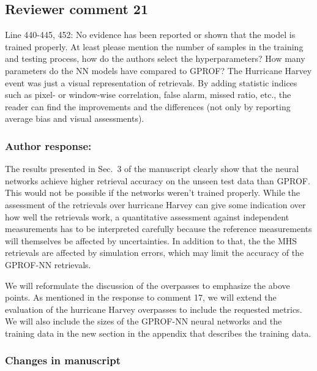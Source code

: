 \subsection{Reviewer comment 21}

Line 440-445, 452: No evidence has been reported or shown that the model is
trained properly. At least please mention the number of samples in the training
and testing process, how do the authors select the hyperparameters? How many
parameters do the NN models have compared to GPROF? The Hurricane Harvey event
was just a visual representation of retrievals. By adding statistic indices such
as pixel- or window-wise correlation, false alarm, missed ratio, etc., the
reader can find the improvements and the differences (not only by reporting
average bias and visual assessments).

\subsubsection{Author response:}

The results presented in Sec.~3 of the manuscript clearly show that the neural
networks achieve higher retrieval accuracy on the unseen test data than GPROF.
This would not be possible if the networks weren't trained properly. While the
assessment of the retrievals over hurricane Harvey can give some indication over
how well the retrievals work, a quantitative assessment against independent
measurements has to be interpreted carefully because the reference measurements
will themselves be affected by uncertainties. In addition to that, the the MHS retrievals
are affected by simulation errors, which may limit the accuracy of the GPROF-NN
retrievals.

We will reformulate the discussion of the overpasses to emphasize the above
points. As mentioned in the response to comment 17, we will extend the
evaluation of the hurricane Harvey overpasses to include the requested metrics.
We will also include the sizes of the GPROF-NN neural networks and the training
data in the new section in the appendix that describes the training data.

\subsubsection{Changes in manuscript}

